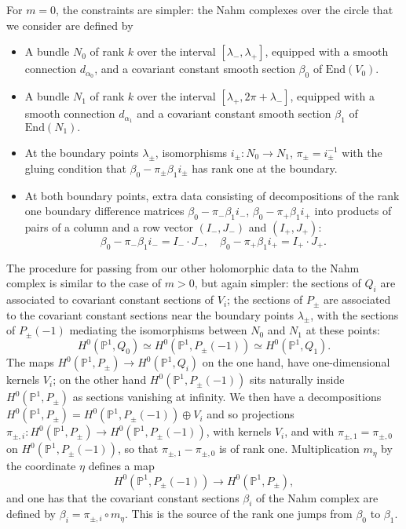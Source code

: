 \documentclass[12pt]{article}
\theoremstyle{definition}
\theoremstyle{remark}
\numberwithin{theorem}{section}
\def\bP{{\mathbb {P}}}
\begin{document}
For $m= 0$, the constraints are simpler: the Nahm complexes over the circle that we consider are defined by
\begin{itemize}
\item A bundle $N_0$ of rank $k$ over the interval
$[\lambda_-, \lambda_+]$, equipped with a smooth connection
$d_{\alpha_{0}}$, and a
covariant constant smooth section $\beta_{0}$ of $\mathrm{End}(V_{ 0})$.
\item A bundle $N_1$ of rank $k$ over the interval
$[\lambda_+, 2\pi+ \lambda_-]$, equipped with a smooth connection
$d_{\alpha_{1}}$ and a covariant constant smooth section
$\beta_{1}$ of $\mathrm{End}(N_1).$
\item At the boundary points $\lambda_\pm$, isomorphisms
$i_\pm\colon N_0\rightarrow N_1$, $\pi_\pm= i_\pm^{-1}$
with the gluing condition that
$\beta_{0}-\pi_\pm\beta_{1}i_\pm$ has rank one at the boundary.
\item At both boundary points, extra data consisting of decompositions  of the rank one boundary difference matrices  
$\beta_{ 0}-\pi_-\beta_{1}i_-$, $\beta_{0}-\pi_+\beta_{1}i_+$ into products of pairs of a column and a row vector $(I_-, J_-)$ and $ (I_+,J_+)$:
\begin{equation}
\beta_{0}-\pi_-\beta_{1}i_-= I_-\cdot J_-,\quad \beta_{0}-\pi_+\beta_{1}i_+ = I_+\cdot J_+.\end{equation}
\end{itemize}

The procedure for passing from our other holomorphic data to the Nahm complex is similar to the case of $m>0$, but again simpler: the sections of $Q_i$ are associated to covariant constant sections of $V_i$; the sections of $P_\pm$ are associated to the covariant constant sections near the boundary points $\lambda_\pm$, with the sections of $P_\pm(-1)$ mediating the isomorphisms between $N_0$ and $N_1$ at these points:
$$H^0 (\bP^1, Q_0) \simeq H^0 (\bP^1, P_\pm(-1))\simeq H^0 (\bP^1, Q_1).$$
The maps  $H^0 (\bP^1, P_\pm )\rightarrow H^0 (\bP^1, Q_i)$ on the one hand, have one-dimensional kernels $V_i$; on the other hand $H^0 (\bP^1, P_\pm(-1))$ sits naturally inside $H^0 (\bP^1, P_\pm )$ as sections vanishing at infinity. We then have a decompositions $H^0 (\bP^1, P_\pm ) = H^0 (\bP^1, P_\pm(-1))\oplus V_i $ and so projections $\pi_{\pm,i}: H^0 (\bP^1, P_\pm ) \rightarrow H^0 (\bP^1, P_\pm(-1))$, with kernels $V_i$, and with $\pi_{\pm,1}=\pi_{\pm,0}$ on $H^0 (\bP^1, P_\pm(-1))$, so that $\pi_{\pm,1}-\pi_{\pm,0}$ is of rank one. Multiplication $m_\eta$ by the coordinate $\eta$ defines a map 
$$H^0 (\bP^1, P_\pm(-1))\rightarrow H^0 (\bP^1, P_\pm),$$
 and one has that the covariant constant sections $\beta_i$ of the Nahm complex are defined by $\beta_i = \pi_{\pm,i}\circ m_\eta$. This is the source of the rank one jumps from $\beta_0$ to $\beta_1$.
\end{document}
